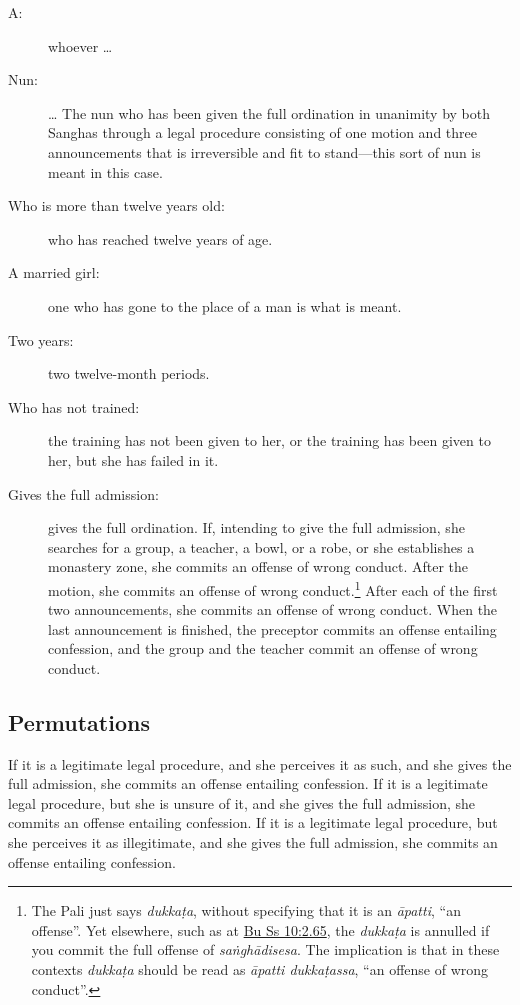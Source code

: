 \documentclass[12pt,openany]{book}%
\begin{document}
\begin{description}%
\item[A: ] whoever … %
\item[Nun: ] … The nun who has been given the full ordination in unanimity by both Sanghas through a legal procedure consisting of one motion and three announcements that is irreversible and fit to stand—this sort of nun is meant in this case. %
\item[Who is more than twelve years old: ] who has reached twelve years of age. %
\item[A married girl: ] one who has gone to the place of a man is what is meant. %
\item[Two years: ] two twelve-month periods. %
\item[Who has not trained: ] the training has not been given to her, or the training has been given to her, but she has failed in it. %
\item[Gives the full admission: ] gives the full ordination. If, intending to give the full admission, she searches for a group, a teacher, a bowl, or a robe, or she establishes a monastery zone, she commits an offense of wrong conduct. After the motion, she commits an offense of wrong conduct.\footnote{The Pali just says \textit{\textsanskrit{dukkaṭa}}, without specifying that it is an \textit{\textsanskrit{āpatti}}, “an offense”. Yet elsewhere, such as at \href{https://suttacentral.net/pli-tv-bu-vb-ss10/en/brahmali\#2.65}{Bu Ss 10:2.65}, the \textit{\textsanskrit{dukkaṭa}} is annulled if you commit the full offense of \textit{\textsanskrit{saṅghādisesa}}. The implication is that in these contexts \textit{\textsanskrit{dukkaṭa}} should be read as \textit{\textsanskrit{āpatti} \textsanskrit{dukkaṭassa}}, “an offense of wrong conduct”. } After each of the first two announcements, she commits an offense of wrong conduct. When the last announcement is finished, the preceptor commits an offense entailing confession, and the group and the teacher commit an offense of wrong conduct. %
\end{description}

\subsection*{Permutations }

If it is a legitimate legal procedure, and she perceives it as such, and she gives the full admission, she commits an offense entailing confession. If it is a legitimate legal procedure, but she is unsure of it, and she gives the full admission, she commits an offense entailing confession. If it is a legitimate legal procedure, but she perceives it as illegitimate, and she gives the full admission, she commits an offense entailing confession. 
\end{document}

